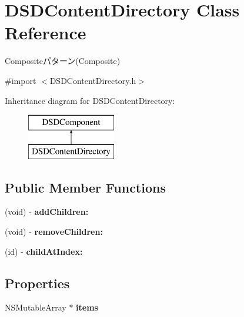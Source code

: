 \hypertarget{interface_d_s_d_content_directory}{\section{D\-S\-D\-Content\-Directory Class Reference}
\label{interface_d_s_d_content_directory}
}


Compositeパターン(\-Composite)  




{\ttfamily \#import $<$D\-S\-D\-Content\-Directory.\-h$>$}

Inheritance diagram for D\-S\-D\-Content\-Directory\-:\begin{figure}[H]
\begin{center}
\leavevmode
\includegraphics[height=2.000000cm]{interface_d_s_d_content_directory}
\end{center}
\end{figure}
\subsection*{Public Member Functions}
\begin{DoxyCompactItemize}
\item 
\hypertarget{interface_d_s_d_content_directory_a3eb03a1038aed8df387470acfbb0d6a0}{(void) -\/ {\bfseries add\-Children\-:}}\label{interface_d_s_d_content_directory_a3eb03a1038aed8df387470acfbb0d6a0}

\item 
\hypertarget{interface_d_s_d_content_directory_a1f66d7b909c3ec22eee2c2b2b03a9694}{(void) -\/ {\bfseries remove\-Children\-:}}\label{interface_d_s_d_content_directory_a1f66d7b909c3ec22eee2c2b2b03a9694}

\item 
\hypertarget{interface_d_s_d_content_directory_a80f6dff869484b83d089f36dcdaeffe6}{(id) -\/ {\bfseries child\-At\-Index\-:}}\label{interface_d_s_d_content_directory_a80f6dff869484b83d089f36dcdaeffe6}

\end{DoxyCompactItemize}
\subsection*{Properties}
\begin{DoxyCompactItemize}
\item 
\hypertarget{interface_d_s_d_content_directory_a6631bf4927eb51f5bbc99c6ad1e6824a}{N\-S\-Mutable\-Array $\ast$ {\bfseries items}}\label{interface_d_s_d_content_directory_a6631bf4927eb51f5bbc99c6ad1e6824a}

\end{DoxyCompactItemize}


